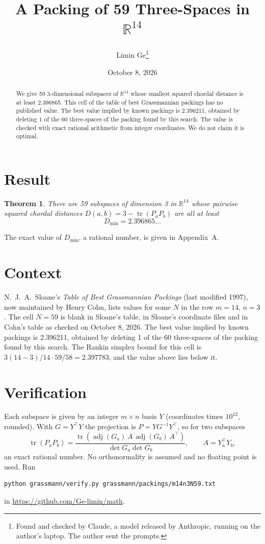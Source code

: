 \documentclass[11pt,a4paper]{article}
\title{A Packing of 59 Three-Spaces in $\mathbb{R}^{14}$}
\author{Limin Ge\thanks{Found and checked by Claude, a model released by Anthropic, running on the author's laptop. The author sent the prompts.}}
\date{October 8, 2026}
\newtheorem*{theorem}{Theorem}
\begin{document}
\maketitle
\begin{abstract}
We give 59 3-dimensional subspaces of $\mathbb{R}^{14}$ whose smallest squared chordal distance is at least 2.396865. This cell of the table of best Grassmannian packings has no published value. The best value implied by known packings is 2.396211, obtained by deleting 1 of the 60 three-spaces of the packing found by this search. The value is checked with exact rational arithmetic from integer coordinates. We do not claim it is optimal.
\end{abstract}

\section{Result}
\begin{theorem}
There are 59 subspaces of dimension 3 in $\mathbb{R}^{14}$ whose pairwise squared chordal distances $D(a,b) = 3 - \operatorname{tr}(P_aP_b)$ are all at least
\[ D_{\min} = 2.396865\ldots \]
\end{theorem}
The exact value of $D_{\min}$, a rational number, is given in Appendix~A.


\section{Context}
N.~J.~A.~Sloane's \emph{Table of Best Grassmannian Packings} (last modified 1997), now maintained by Henry Cohn, lists values for some $N$ in the row $m=14$, $n=3$. The cell $N=59$ is blank in Sloane's table, in Sloane's coordinate files and in Cohn's table as checked on October 8, 2026. The best value implied by known packings is 2.396211, obtained by deleting 1 of the 60 three-spaces of the packing found by this search. The Rankin simplex bound for this cell is $3(14-3)/14\cdot 59/58 = 2.397783$, and the value above lies below it.


\section{Verification}
Each subspace is given by an integer $m\times n$ basis $Y$ (coordinates times $10^{12}$, rounded). With $G=Y^\top Y$ the projection is $P=YG^{-1}Y^\top$, so for two subspaces
\[ \operatorname{tr}(P_aP_b)=\frac{\operatorname{tr}(\operatorname{adj}(G_a)\,A\,\operatorname{adj}(G_b)\,A^\top)}{\det G_a\det G_b},\qquad A=Y_a^\top Y_b, \]
an exact rational number. No orthonormality is assumed and no floating point is used. Run
\begin{verbatim}
python grassmann/verify.py grassmann/packings/m14n3N59.txt
\end{verbatim}
in \url{https://github.com/Ge-limin/math}.
\end{document}
